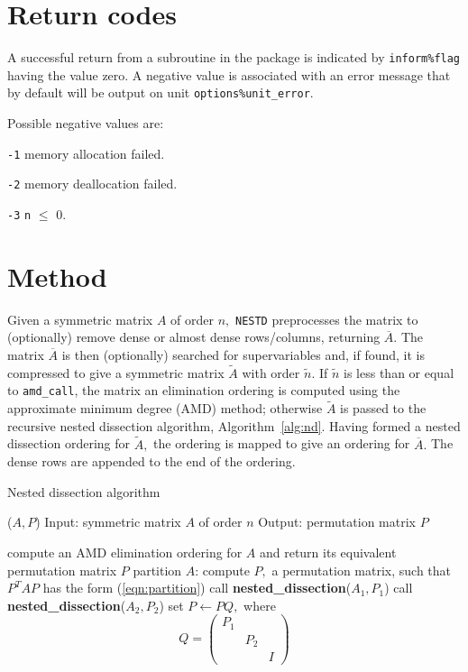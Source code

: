 
\section{Return codes} \label{nestd:errors}

A successful return from a subroutine in the package is indicated by
{\tt inform\%flag} having the value zero.
A negative value is associated with an error message that by default will
be output on unit {\tt options\%unit\_error}.

Possible negative values are:

\begin{description}

\item{} {\tt -1} memory allocation failed.
\item{} {\tt -2} memory deallocation failed.
\item{} {\tt -3} {\tt n} $\le$ 0.
\end{description}


\section{Method} \label{method}

Given a symmetric matrix $A$ of order $n,$ {\tt NESTD} preprocesses 
the matrix to (optionally) remove dense or almost dense rows/columns, returning 
$\overline{A}.$ The matrix $\overline{A}$ is then (optionally) searched for 
supervariables and, if found, it is compressed to give a symmetric matrix 
$\widetilde{A}$ with order $\tilde{n}.$ If $\tilde{n}$ is less than or equal to 
{\tt amd\_call}, the matrix an elimination ordering is computed using the 
approximate minimum degree (AMD) method; otherwise $\widetilde{A}$ is passed to the 
recursive nested dissection algorithm, Algorithm~\ref{alg:nd}. Having formed a 
nested dissection ordering for $\widetilde{A},$ the 
ordering is mapped to give an ordering for $\overline{A}.$ The dense rows are 
appended to the end of the ordering. 

\begin{algorithm}\caption{Nested dissection algorithm}\label{alg:nd}
\begin{algorithmic}
($A,P$)
\STATE Input: symmetric matrix $A$ of order $n$
\STATE Output: permutation matrix $P$

\STATE compute an AMD elimination ordering for $A$ and return its equivalent 
permutation matrix $P$ 
\ELSE
\STATE partition $A$: compute $P,$ a permutation matrix, such that $P^T A P$ 
has the form (\ref{eqn:partition})
\STATE call {\bf nested\_dissection}($A_1,P_1$)
\STATE call {\bf nested\_dissection}($A_2,P_2$)
\STATE set $P \leftarrow PQ,$ where $$Q = \left( \begin{array}{ccc} P_1 & & \\ & P_2 & \\ & & I  \end{array} \right)$$
\ENDIF

\end{algorithmic}
\end{algorithm}

